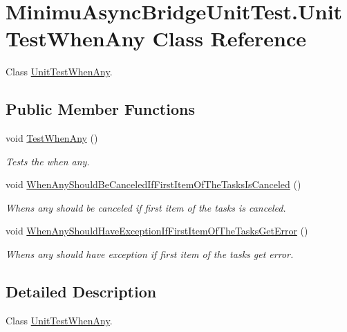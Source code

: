 \hypertarget{class_minimu_async_bridge_unit_test_1_1_unit_test_when_any}{}\section{Minimu\+Async\+Bridge\+Unit\+Test.\+Unit\+Test\+When\+Any Class Reference}
\label{class_minimu_async_bridge_unit_test_1_1_unit_test_when_any}


Class \hyperlink{class_minimu_async_bridge_unit_test_1_1_unit_test_when_any}{Unit\+Test\+When\+Any}.  


\subsection*{Public Member Functions}
\begin{DoxyCompactItemize}
\item 
void \hyperlink{class_minimu_async_bridge_unit_test_1_1_unit_test_when_any_a1a634fcd13d3cc0689ebb5880498926e}{Test\+When\+Any} ()
\begin{DoxyCompactList}\small\item\em Tests the when any. \end{DoxyCompactList}\item 
void \hyperlink{class_minimu_async_bridge_unit_test_1_1_unit_test_when_any_a090bbe17edecbf670ea639fdd40fbf97}{When\+Any\+Should\+Be\+Canceled\+If\+First\+Item\+Of\+The\+Tasks\+Is\+Canceled} ()
\begin{DoxyCompactList}\small\item\em Whens any should be canceled if first item of the tasks is canceled. \end{DoxyCompactList}\item 
void \hyperlink{class_minimu_async_bridge_unit_test_1_1_unit_test_when_any_a4d62e663384162142fa3fdcf8ee49a0b}{When\+Any\+Should\+Have\+Exception\+If\+First\+Item\+Of\+The\+Tasks\+Get\+Error} ()
\begin{DoxyCompactList}\small\item\em Whens any should have exception if first item of the tasks get error. \end{DoxyCompactList}\end{DoxyCompactItemize}


\subsection{Detailed Description}
Class \hyperlink{class_minimu_async_bridge_unit_test_1_1_unit_test_when_any}{Unit\+Test\+When\+Any}. 



